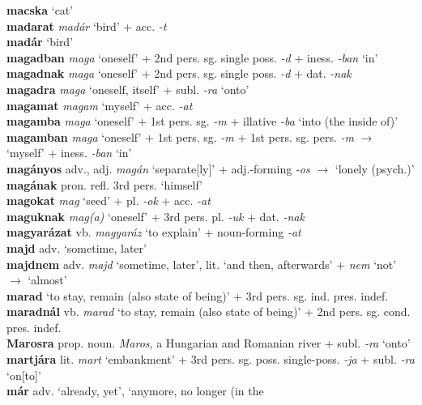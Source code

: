 \documentclass[11pt]{article}
\begin{document}
\textbf{macska} `cat' \\
\textbf{madarat} \emph{madár} `bird' + acc. \emph{-t} \\
\textbf{madár} `bird' \\
\textbf{magadban} \emph{maga} `oneself' + 2nd pers. sg. single
  poss. \emph{-d} + iness. \emph{-ban} `in' \\
\textbf{magadnak} \emph{maga} `oneself' + 2nd pers. sg. single
  poss. \emph{-d} + dat. \emph{-nak} \\
\textbf{magadra} \emph{maga} `oneself, itself' + subl. \emph{-ra}
`onto' \\
\textbf{magamat} \emph{magam} `myself' + acc. \emph{-at} \\
\textbf{magamba} \emph{maga} `oneself' + 1st pers. sg. \emph{-m} +
illative \emph{-ba} `into (the inside of)' \\
\textbf{magamban} \emph{maga} `oneself' + 1st pers. sg. \emph{-m} +
1st pers. sg. pers. \emph{-m} $\rightarrow$ `myself' +
iness. \emph{-ban} `in' \\
\textbf{magányos} adv., adj. \emph{magán} `separate[ly]' +
adj.\hyp{}forming \emph{-os} $\rightarrow$ `lonely (psych.)' \\
\textbf{magának} pron. refl. 3rd pers. `himself' \\
\textbf{magokat} \emph{mag} `seed' + pl. \emph{-ok} +
acc. \emph{-at} \\
\textbf{maguknak} \emph{mag(a)} `oneself' + 3rd pers. pl. \emph{-uk} +
dat. \emph{-nak} \\
\textbf{magyarázat} vb. \emph{magyaráz} `to explain' +
noun\hyp{}forming \emph{-at} \\
\textbf{majd} adv. `sometime, later' \\
\textbf{majdnem} adv. \emph{majd} `sometime, later', lit. `and then,
afterwards' + \emph{nem} `not'
$\rightarrow$ `almost' \\
\textbf{marad} `to stay, remain (also state of
being)' + 3rd pers. sg. ind. pres. indef. \\
\textbf{maradnál} vb. \emph{marad} `to stay, remain (also state of
being)' + 2nd pers. sg. cond. pres. indef. \\
\textbf{Marosra} prop. noun. \emph{Maros}, a Hungarian and Romanian
river + subl. \emph{-ra} `onto' \\
\textbf{martjára} lit. \emph{mart} `embankment' + 3rd
pers. sg. poss. single\hyp{}poss. \emph{-ja} + subl. \emph{-ra}
`on[to]' \\
\textbf{már} adv. `already, yet', `anymore, no longer (in the
\end{document}
